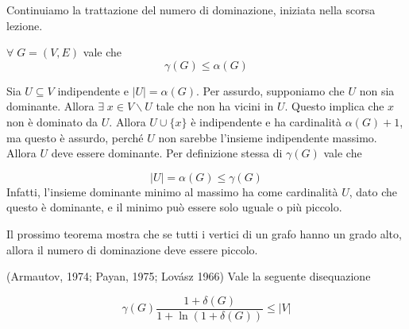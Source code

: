\documentclass[12pt]{report}
\begin{document}
Continuiamo la trattazione del numero di dominazione, iniziata nella scorsa lezione.

\begin{fatto}
    $\forall  \; G = (V,E)$ vale che 
    $$\gamma(G) \leq \alpha(G)$$
\end{fatto}

\begin{dimo}
    Sia $U \subseteq V$ indipendente e $|U| = \alpha(G)$. Per assurdo, supponiamo che $U$ non sia dominante.  Allora $\exists \;x \in V\backslash U$ tale che non ha vicini in $U$. Questo implica che $x$ non è dominato da $U$. Allora $U \cup \{x\}$ è indipendente e ha cardinalità $\alpha(G) + 1$, ma questo è assurdo, perché $U$ non sarebbe l'insieme indipendente massimo. Allora $U$ deve essere dominante. Per definizione stessa di $\gamma(G)$ vale che 
    
    $$|U| = \alpha(G) \leq \gamma(G)$$
    Infatti, l'insieme dominante minimo al massimo ha come cardinalità $U$, dato che questo è dominante, e il minimo può essere solo uguale o più piccolo.
\end{dimo}

\noindent 
Il prossimo teorema mostra che se tutti i vertici di un grafo hanno un grado alto, allora il numero di dominazione deve essere piccolo.

\begin{teo}
    (Armautov, 1974; Payan, 1975; Lovász 1966)
    Vale la seguente disequazione

    $$\gamma(G) \frac{1 + \delta(G)}{1 + \ln{(1 + \delta(G))}} \leq |V|$$
\end{teo}
\end{document}

